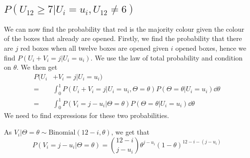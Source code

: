 \subsection{$P(U_{12}\geq 7|U_i=u_i,U_{12}\neq6)$}
We can now find the probability that red is the majority colour given the colour of the boxes that already are opened. Firstly, we find the probability that there are $j$ red boxes when all twelve boxes are opened given $i$ opened boxes, hence we find $P(U_i+V_i = j | U_i=u_i)$.
We use the law of total probability and condition on $\theta$. We then get
\begin{equation} 
\label{prob_red_major}
    \begin{aligned}
        P(U_i&+V_i = j | U_i=u_i) \\[6pt]
        =& \int_0^1 P(U_i+V_i = j | U_i=u_i, \Theta=\theta) P(\Theta=\theta| U_i=u_i) \dd \theta \\[6pt]
        =& \int_0^1 P(V_i = j-u_i | \Theta=\theta) P(\Theta=\theta| U_i=u_i) \dd \theta
    \end{aligned}
\end{equation}
We need to find expressions for these two probabilities. 

As $V_i|\Theta=\theta \sim \text{Binomial}(12-i,\theta)$, we get that 
\begin{equation*}
    P(V_i=j-u_i|\Theta=\theta)=\binom{12-i}{j-u_i}\theta^{j-u_i}(1-\theta)^{12-i-(j-u_i)}
\end{equation*}


